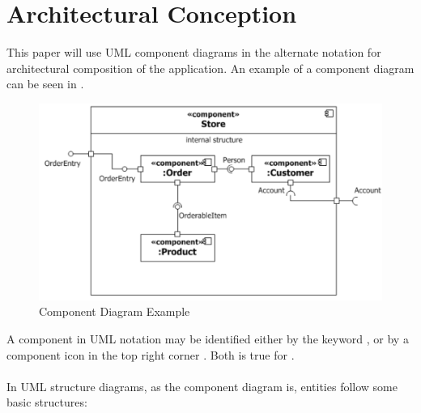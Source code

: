 \section{Architectural Conception}
This paper will use UML component diagrams in the alternate notation \parencite[cf.][212]{ObjectManagementGroup.01.03.2015} for architectural composition of the application. An example of a component diagram can be seen in .

\begin{figure}[H]
    \centering
    \includegraphics[width=\textwidth]{img/componentExample.pdf}
    \caption[Component Diagram Example]{Component Diagram Example \parencites[2132]{ObjectManagementGroup.01.03.2015}}
    \label{fig:comEx}
\end{figure}

A component in UML notation may be identified either by the keyword , or by a component icon in the top right corner \parencites[cf.][208]{ObjectManagementGroup.01.03.2015}. Both is true for . 

\paragraph{} In UML structure diagrams, as the component diagram is, entities follow some basic structures:

